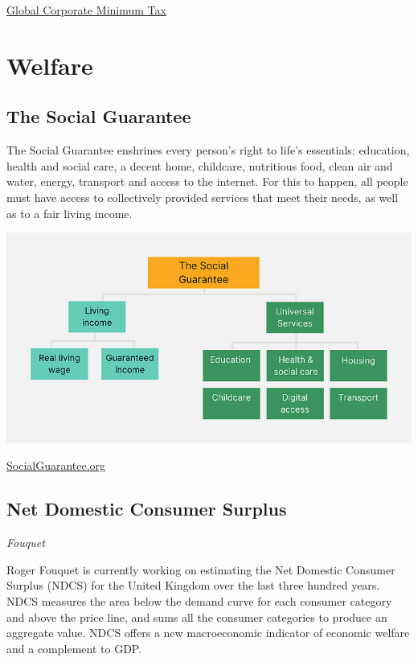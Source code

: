 \documentclass[
]{book}
\begin{document}
\href{https://www.taxjustice.net/2021/04/07/us-treasury-secretary-yellen-confirms-its-time-to-end-the-race-to-the-bottom-on-corporate-tax/}{Global Corporate Minimum Tax}

\hypertarget{welfare}{%
\chapter{Welfare}\label{welfare}}

\hypertarget{the-social-guarantee}{%
\section{The Social Guarantee}\label{the-social-guarantee}}

The Social Guarantee enshrines every person's right to life's essentials: education, health and social care, a decent home, childcare, nutritious food, clean air and water, energy, transport and access to the internet. For this to happen, all people must have access to collectively provided services that meet their needs, as well as to a fair living income.

\includegraphics{fig/social_guarantee.png}

\href{https://www.socialguarantee.org/}{SocialGuarantee.org}

\hypertarget{net-domestic-consumer-surplus}{%
\section{Net Domestic Consumer Surplus}\label{net-domestic-consumer-surplus}}

\emph{Fouquet}

Roger Fouquet is currently working on estimating the Net Domestic Consumer Surplus (NDCS) for the United Kingdom over the last three hundred years. NDCS measures the area below the demand curve for each consumer category and above the price line, and sums all the consumer categories to produce an aggregate value. NDCS offers a new macroeconomic indicator of economic welfare and a complement to GDP.
\end{document}
